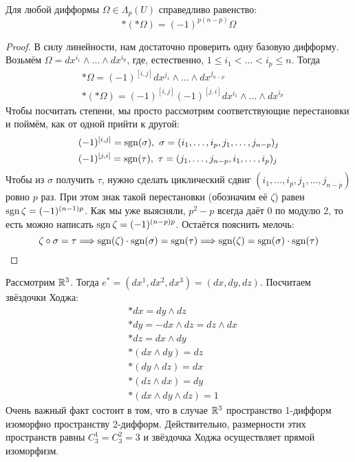 \begin{proposition}
	Для любой дифформы $\Omega \in \Lambda_p(U)$ справедливо равенство:
	\[
		*(*\Omega) = (-1)^{p(n - p)}\Omega
	\]
\end{proposition}

\begin{proof}
	В силу линейности, нам достаточно проверить одну базовую дифформу. Возьмём $\Omega = dx^{i_1} \wedge \ldots \wedge dx^{i_p}$, где, естественно, $1 \le i_1 < \ldots < i_p \le n$. Тогда
	\begin{align*}
		&{*\Omega = (-1)^{[i, j]} dx^{j_1} \wedge \ldots \wedge dx^{j_{n - p}}}
		\\
		&{*(*\Omega) = (-1)^{[i, j]} (-1)^{[j, i]} dx^{i_1} \wedge \ldots \wedge dx^{i_p}}
	\end{align*}
	Чтобы посчитать степени, мы просто рассмотрим соответствующие перестановки и поймём, как от одной прийти к другой:
	\begin{align*}
		&{(-1)^{[i, j]} = \operatorname{sgn}(\sigma),\ \sigma = (i_1, \ldots, i_p, j_1, \ldots, j_{n - p})_j}
		\\
		&{(-1)^{[j, i]} = \operatorname{sgn}(\tau),\ \tau = (j_1, \ldots, j_{n - p}, i_1, \ldots, i_p)_j}
	\end{align*}
	Чтобы из $\sigma$ получить $\tau$, нужно сделать циклический сдвиг $(i_1, \ldots, i_p, j_1, \ldots, j_{n - p})$ ровно $p$ раз. При этом знак такой перестановки (обозначим её $\zeta$) равен$\operatorname{sgn} \zeta = (-1)^{(n - 1)p}$. Как мы уже выясняли, $p^2 - p$ всегда даёт 0 по модулю 2, то есть можно написать $\operatorname{sgn} \zeta = (-1)^{(n - p)p}$. Остаётся пояснить мелочь:
	\[
		\zeta \circ \sigma = \tau \Longrightarrow \operatorname{sgn}(\zeta) \cdot \operatorname{sgn}(\sigma) = \operatorname{sgn}(\tau) \Longrightarrow \operatorname{sgn}(\zeta) = \operatorname{sgn}(\sigma) \cdot \operatorname{sgn}(\tau)
	\]
\end{proof}

\begin{example}
	Рассмотрим $\mathbb{R}^3$. Тогда $e^* = (dx^1, dx^2, dx^3) = (dx, dy, dz)$. Посчитаем звёздочки Ходжа:
	\begin{align*}
	&{*dx = dy \wedge dz}
	\\
	&{*dy = -dx \wedge dz = dz \wedge dx}
	\\
	&{*dz = dx \wedge dy}
	\\
	&{*(dx \wedge dy) = dz}
	\\
	&{*(dy \wedge dz) = dx}
	\\
	&{*(dz \wedge dx) = dy}
	\\
	&{*(dx \wedge dy \wedge dz) = 1}
	\end{align*}
	Очень важный факт состоит в том, что в случае $\mathbb{R}^3$ пространство 1-дифформ изоморфно пространству 2-дифформ. Действительно, размерности этих пространств равны $C_3^1 = C_3^2 = 3$ и звёздочка Ходжа осуществляет прямой изоморфизм.
\end{example}

